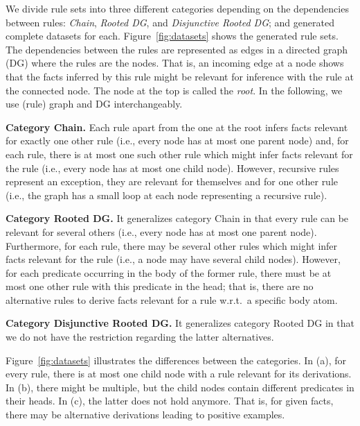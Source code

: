 We divide rule sets into three different categories depending on the dependencies between rules: \emph{Chain}, \emph{Rooted DG}, and \emph{Disjunctive Rooted DG}; and generated complete datasets for each. %
Figure~\ref{fig:datasets} shows the generated rule sets. %
The dependencies between the rules are represented as edges in a directed graph (DG) where the rules are the nodes. That is, an incoming edge at a node shows that the facts inferred by this rule might be relevant for inference with the rule at the connected node.
The %
node at the top
is called the \emph{root}. In the following, we use (rule) graph and DG interchangeably. %

\textbf{Category Chain.} Each rule apart from the one at the root infers facts relevant for exactly one other rule (i.e., every node has at most one parent node) and, for each rule, there is at most one such other rule which might infer facts relevant for the rule (i.e., every node has at most one child node). However, recursive rules represent an exception, they are relevant for themselves and for one other rule (i.e., the graph has a small loop at each node representing a recursive rule).
% 

\textbf{Category Rooted DG.} It generalizes category Chain in that every rule can be relevant for several others (i.e., every node has at most one parent node).
Furthermore, for each rule, there may be several other rules which might infer facts relevant for the rule (i.e., a node may have several child nodes). However, for each predicate occurring in the body of the former rule, there must be at most one other rule with this predicate in the head; %
that is, there are no alternative rules to derive facts relevant for a rule w.r.t.\ a specific body atom. 
%

\textbf{Category Disjunctive Rooted DG.} It generalizes category Rooted DG in that we do not have the restriction regarding the latter alternatives.

Figure~\ref{fig:datasets} illustrates the differences between the categories. In (a), for every rule, there is at most one child node with a rule relevant for its derivations.
In (b), there might be multiple, but the child nodes contain different predicates in their heads. In (c), the latter does not hold anymore. That is, for given facts, there may be alternative derivations leading to positive examples.

